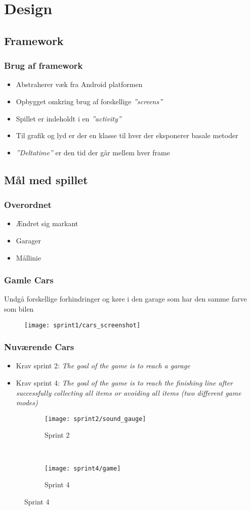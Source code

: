 \section{Design}


\subsection{Framework}
\begin{frame}
\frametitle{Brug af framework}
\begin{itemize}
\item Abstraherer væk fra Android platformen
\item Opbygget omkring brug af forskellige \textit{''screens''}
\item Spillet er indeholdt i en \textit{''activity''}
\item Til grafik og lyd er der en klasse til hver der eksponerer basale metoder
\item \textit{''Deltatime''} er den tid der går mellem hver frame
\end{itemize}
\end{frame}


\subsection{Mål med spillet}
\begin{frame}
\frametitle{Overordnet}
\begin{itemize}
\item Ændret sig markant
\item Garager
\item Mållinie
\end{itemize}
\end{frame}

\begin{frame}
\frametitle{Gamle Cars}
Undgå forskellige forhindringer og køre i den garage som har den samme farve som bilen
\begin{figure}
\texttt{[image: sprint1/cars\_screenshot]}
\end{figure}
\end{frame}

\begin{frame}
\frametitle{Nuværende Cars}
\begin{itemize}
\item Krav sprint 2: \textit{The goal of the game is to reach a garage}
\item Krav sprint 4: \textit{The goal of the game is to reach the finishing line
after successfully collecting all items or avoiding
all items (two different game modes)}
\end{itemize}
\begin{figure}
\begin{subfigure}[b]{0.4\textwidth}
\texttt{[image: sprint2/sound\_gauge]}
\caption*{Sprint 2}
\end{subfigure}
~
\begin{subfigure}[b]{0.4\textwidth}
\texttt{[image: sprint4/game]}
\caption*{Sprint 4}
\end{subfigure}
\end{figure}
\end{frame}


